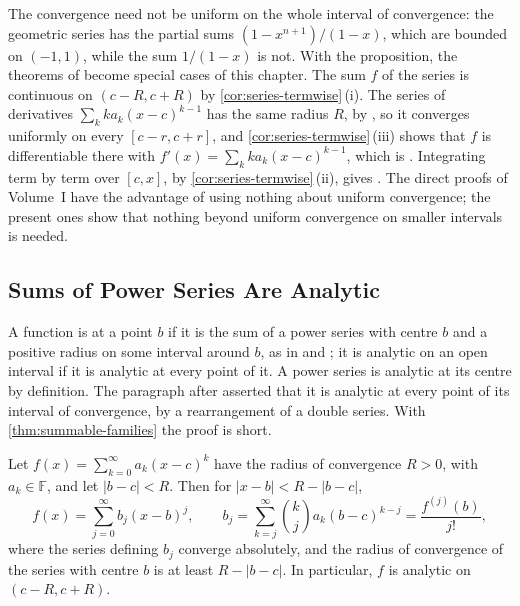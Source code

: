 The convergence need not be uniform on the whole interval of convergence: the geometric series has the partial sums $(1-x^{n+1})/(1-x)$, which are bounded on $(-1,1)$, while the sum $1/(1-x)$ is not. With the proposition, the theorems of  become special cases of this chapter. The sum $f$ of the series is continuous on $(c-R,c+R)$ by \cref{cor:series-termwise}\,(i). The series of derivatives $\sum_kka_k(x-c)^{k-1}$ has the same radius $R$, by , so it converges uniformly on every $[c-r,c+r]$, and \cref{cor:series-termwise}\,(iii) shows that $f$ is differentiable there with $f'(x)=\sum_kka_k(x-c)^{k-1}$, which is . Integrating term by term over $[c,x]$, by \cref{cor:series-termwise}\,(ii), gives . The direct proofs of Volume~I have the advantage of using nothing about uniform convergence; the present ones show that nothing beyond uniform convergence on smaller intervals is needed.

\subsection{Sums of Power Series Are Analytic}

A function is  at a point $b$ if it is the sum of a power series with centre $b$ and a positive radius on some interval around $b$, as in  and ; it is analytic on an open interval if it is analytic at every point of it. A power series is analytic at its centre by definition. The paragraph after  asserted that it is analytic at every point of its interval of convergence, by a rearrangement of a double series. With \cref{thm:summable-families} the proof is short.

\begin{theorem}
\label{thm:change-centre}
Let $f(x)=\sum_{k=0}^\infty a_k(x-c)^k$ have the radius of convergence $R>0$, with $a_k\in\mathbb F$, and let $|b-c|<R$. Then for $|x-b|<R-|b-c|$,
\[
f(x)=\sum_{j=0}^\infty b_j(x-b)^j,\qquad b_j=\sum_{k=j}^\infty\binom kja_k(b-c)^{k-j}=\frac{f^{(j)}(b)}{j!},
\]
where the series defining $b_j$ converge absolutely, and the radius of convergence of the series with centre $b$ is at least $R-|b-c|$. In particular, $f$ is analytic on $(c-R,c+R)$.
\end{theorem}


